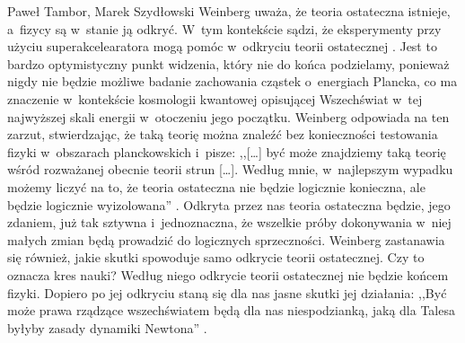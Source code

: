 \begin{artplenv2auth}{Paweł Tambor, Marek Szydłowski}
Weinberg uważa, że teoria ostateczna istnieje, a~fizycy są w~stanie ją odkryć. W~tym kontekście sądzi, że eksperymenty przy użyciu superakcelearatora mogą pomóc w~odkryciu teorii ostatecznej
\parencite[][s.~186]{weinberg_sen_1992}. %
 Jest to bardzo optymistyczny punkt widzenia, który nie do końca podzielamy, ponieważ nigdy nie będzie możliwe badanie zachowania cząstek o~energiach Plancka, co ma znaczenie w~kontekście kosmologii kwantowej opisującej Wszechświat w~tej najwyższej skali energii w~otoczeniu jego początku. \mbox{Weinberg} odpowiada na ten zarzut, stwierdzając, że taką teorię można znaleźć bez konieczności testowania fizyki w~obszarach planckowskich i~pisze: ,,[\ldots] być może znajdziemy taką teorię wśród rozważanej obecnie teorii strun [\ldots]. Według mnie, w~najlepszym wypadku możemy liczyć na to, że teoria ostateczna nie będzie logicznie konieczna, ale będzie logicznie wyizolowana'' 
\parencite[][s.~187]{weinberg_sen_1992}. %
 Odkryta przez nas teoria ostateczna będzie, jego zdaniem, już tak sztywna i~jednoznaczna, że wszelkie próby dokonywania w~niej małych zmian będą prowadzić do logicznych sprzeczności. Weinberg zastanawia się również, jakie skutki spowoduje samo odkrycie teorii ostatecznej. Czy to oznacza kres nauki? Według niego odkrycie teorii ostatecznej nie będzie końcem fizyki. Dopiero po jej odkryciu staną się dla nas jasne skutki jej działania: ,,Być może prawa rządzące wszechświatem będą dla nas niespodzianką, jaką dla Talesa byłyby zasady dynamiki Newtona'' 
\parencite[][s.~190]{weinberg_sen_1992}.%



\end{artplenv2auth}
